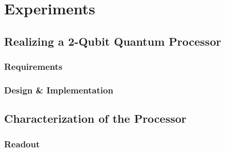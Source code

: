 
\chapter{Experiments}


\section{Realizing a 2-Qubit Quantum Processor}


\subsection{Requirements}


\subsection{Design \& Implementation}


\section{Characterization of the Processor}


\subsection{Readout}

